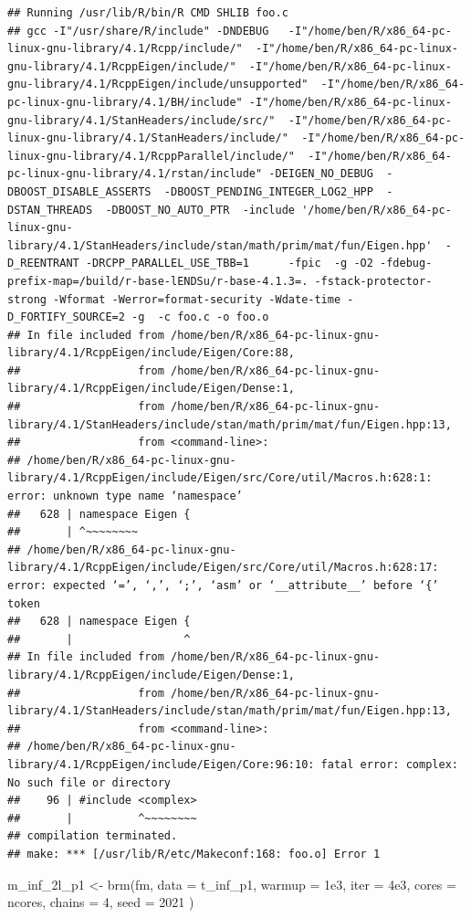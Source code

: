 \documentclass[
]{article}
\newenvironment{Shaded}{\begin{snugshade}}{\end{snugshade}}
\newcommand{\AttributeTok}[1]{\textcolor[rgb]{0.77,0.63,0.00}{#1}}
\newcommand{\DecValTok}[1]{\textcolor[rgb]{0.00,0.00,0.81}{#1}}
\newcommand{\FloatTok}[1]{\textcolor[rgb]{0.00,0.00,0.81}{#1}}
\newcommand{\FunctionTok}[1]{\textcolor[rgb]{0.00,0.00,0.00}{#1}}
\newcommand{\NormalTok}[1]{#1}
\newcommand{\OtherTok}[1]{\textcolor[rgb]{0.56,0.35,0.01}{#1}}
\begin{document}
\begin{verbatim}
## Running /usr/lib/R/bin/R CMD SHLIB foo.c
## gcc -I"/usr/share/R/include" -DNDEBUG   -I"/home/ben/R/x86_64-pc-linux-gnu-library/4.1/Rcpp/include/"  -I"/home/ben/R/x86_64-pc-linux-gnu-library/4.1/RcppEigen/include/"  -I"/home/ben/R/x86_64-pc-linux-gnu-library/4.1/RcppEigen/include/unsupported"  -I"/home/ben/R/x86_64-pc-linux-gnu-library/4.1/BH/include" -I"/home/ben/R/x86_64-pc-linux-gnu-library/4.1/StanHeaders/include/src/"  -I"/home/ben/R/x86_64-pc-linux-gnu-library/4.1/StanHeaders/include/"  -I"/home/ben/R/x86_64-pc-linux-gnu-library/4.1/RcppParallel/include/"  -I"/home/ben/R/x86_64-pc-linux-gnu-library/4.1/rstan/include" -DEIGEN_NO_DEBUG  -DBOOST_DISABLE_ASSERTS  -DBOOST_PENDING_INTEGER_LOG2_HPP  -DSTAN_THREADS  -DBOOST_NO_AUTO_PTR  -include '/home/ben/R/x86_64-pc-linux-gnu-library/4.1/StanHeaders/include/stan/math/prim/mat/fun/Eigen.hpp'  -D_REENTRANT -DRCPP_PARALLEL_USE_TBB=1      -fpic  -g -O2 -fdebug-prefix-map=/build/r-base-lENDSu/r-base-4.1.3=. -fstack-protector-strong -Wformat -Werror=format-security -Wdate-time -D_FORTIFY_SOURCE=2 -g  -c foo.c -o foo.o
## In file included from /home/ben/R/x86_64-pc-linux-gnu-library/4.1/RcppEigen/include/Eigen/Core:88,
##                  from /home/ben/R/x86_64-pc-linux-gnu-library/4.1/RcppEigen/include/Eigen/Dense:1,
##                  from /home/ben/R/x86_64-pc-linux-gnu-library/4.1/StanHeaders/include/stan/math/prim/mat/fun/Eigen.hpp:13,
##                  from <command-line>:
## /home/ben/R/x86_64-pc-linux-gnu-library/4.1/RcppEigen/include/Eigen/src/Core/util/Macros.h:628:1: error: unknown type name ‘namespace’
##   628 | namespace Eigen {
##       | ^~~~~~~~~
## /home/ben/R/x86_64-pc-linux-gnu-library/4.1/RcppEigen/include/Eigen/src/Core/util/Macros.h:628:17: error: expected ‘=’, ‘,’, ‘;’, ‘asm’ or ‘__attribute__’ before ‘{’ token
##   628 | namespace Eigen {
##       |                 ^
## In file included from /home/ben/R/x86_64-pc-linux-gnu-library/4.1/RcppEigen/include/Eigen/Dense:1,
##                  from /home/ben/R/x86_64-pc-linux-gnu-library/4.1/StanHeaders/include/stan/math/prim/mat/fun/Eigen.hpp:13,
##                  from <command-line>:
## /home/ben/R/x86_64-pc-linux-gnu-library/4.1/RcppEigen/include/Eigen/Core:96:10: fatal error: complex: No such file or directory
##    96 | #include <complex>
##       |          ^~~~~~~~~
## compilation terminated.
## make: *** [/usr/lib/R/etc/Makeconf:168: foo.o] Error 1
\end{verbatim}

\begin{Shaded}
\begin{Highlighting}[]
\NormalTok{m\_inf\_2l\_p1 }\OtherTok{\textless{}{-}} \FunctionTok{brm}\NormalTok{(fm, }\AttributeTok{data =}\NormalTok{ t\_inf\_p1, }
                   \AttributeTok{warmup =} \FloatTok{1e3}\NormalTok{, }\AttributeTok{iter =} \FloatTok{4e3}\NormalTok{, }\AttributeTok{cores =}\NormalTok{ ncores, }\AttributeTok{chains =} \DecValTok{4}\NormalTok{, }
                   \AttributeTok{seed =} \DecValTok{2021}
\NormalTok{                   )}
\end{Highlighting}
\end{Shaded}
\end{document}

